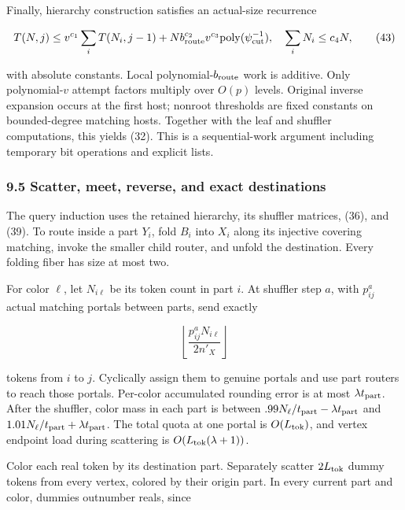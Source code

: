 Finally, hierarchy construction satisfies an actual-size recurrence

\[
T(N,j)\leq v^{c_1}\sum_iT(N_i,j-1)
       +N b_{\rm route}^{c_2}v^{c_3}
                      \mathrm{poly}(\psi_{\rm cut}^{-1}),
 \quad \sum_iN_i\leq c_4N,
 \tag{43}
\]

with absolute constants. Local polynomial-\(b_{\rm route}\) work is additive. Only polynomial-\(v\) attempt factors multiply over \(O(p)\) levels. Original inverse expansion occurs at the first host; nonroot thresholds are fixed constants on bounded-degree matching hosts. Together with the leaf and shuffler computations, this yields (32). This is a sequential-work argument including temporary bit operations and explicit lists.

\hypertarget{af-46593eb93e-scatter-meet-reverse-and-exact-destinations}{%
\subsubsection{9.5 Scatter, meet, reverse, and exact destinations}\label{af-46593eb93e-scatter-meet-reverse-and-exact-destinations}}

The query induction uses the retained hierarchy, its shuffler matrices, (36), and (39). To route inside a part \(Y_i\), fold \(B_i\) into \(X_i\) along its injective covering matching, invoke the smaller child router, and unfold the destination. Every folding fiber has size at most two.

For color \(\ell\), let \(N_{i\ell}\) be its token count in part \(i\). At shuffler step \(a\), with \(p_{ij}^a\) actual matching portals between parts, send exactly

\[
\left\lfloor\frac{p_{ij}^a N_{i\ell}}{2n'_X}\right\rfloor
 \tag{44}
\]

tokens from \(i\) to \(j\). Cyclically assign them to genuine portals and use part routers to reach those portals. Per-color accumulated rounding error is at most \(\lambda t_{\rm part}\). After the shuffler, color mass in each part is between \(.99N_\ell/t_{\rm part}-\lambda t_{\rm part}\) and \(1.01N_\ell/t_{\rm part}+\lambda t_{\rm part}\). The total quota at one portal is \(O(L_{\rm tok})\), and vertex endpoint load during scattering is \(O(L_{\rm tok}(\lambda+1))\).

Color each real token by its destination part. Separately scatter \(2L_{\rm tok}\) dummy tokens from every vertex, colored by their origin part. In every current part and color, dummies outnumber reals, since

